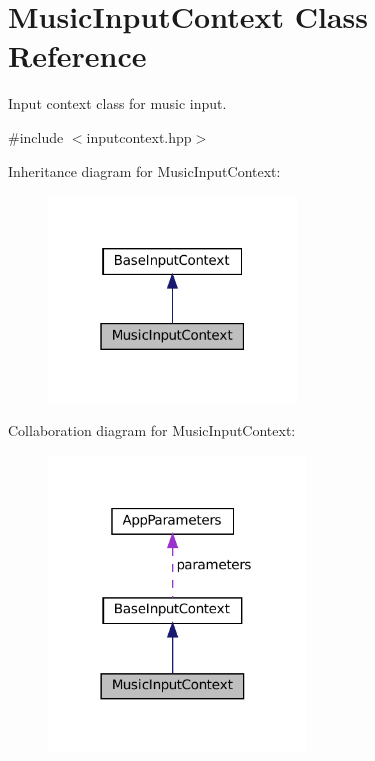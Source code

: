 \hypertarget{classMusicInputContext}{}\section{Music\+Input\+Context Class Reference}
\label{classMusicInputContext}


Input context class for music input.  




{\ttfamily \#include $<$inputcontext.\+hpp$>$}



Inheritance diagram for Music\+Input\+Context\+:\nopagebreak
\begin{figure}[H]
\begin{center}
\leavevmode
\includegraphics[width=187pt]{classMusicInputContext__inherit__graph}
\end{center}
\end{figure}


Collaboration diagram for Music\+Input\+Context\+:\nopagebreak
\begin{figure}[H]
\begin{center}
\leavevmode
\includegraphics[width=194pt]{classMusicInputContext__coll__graph}
\end{center}
\end{figure}
